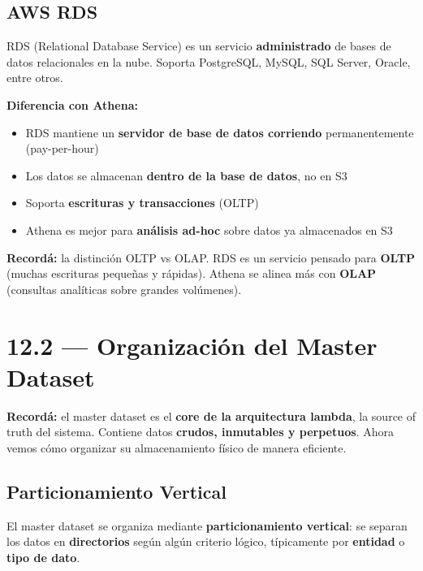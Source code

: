 \documentclass[11pt, a4paper]{article}
\begin{document}
\subsection{AWS RDS}

RDS (Relational Database Service) es un servicio \textbf{administrado} de bases de datos relacionales en la nube. Soporta PostgreSQL, MySQL, SQL Server, Oracle, entre otros.

\textbf{Diferencia con Athena:}
\begin{itemize}
	\item RDS mantiene un \textbf{servidor de base de datos corriendo} permanentemente (pay-per-hour)
	\item Los datos se almacenan \textbf{dentro de la base de datos}, no en S3
	\item Soporta \textbf{escrituras y transacciones} (OLTP)
	\item Athena es mejor para \textbf{análisis ad-hoc} sobre datos ya almacenados en S3
\end{itemize}

\begin{recallbox}
	\textbf{Recordá:} la distinción OLTP vs OLAP. RDS es un servicio pensado para \textbf{OLTP} (muchas escrituras pequeñas y rápidas). Athena se alinea más con \textbf{OLAP} (consultas analíticas sobre grandes volúmenes).
\end{recallbox}

\section{12.2 — Organización del Master Dataset}

\begin{recallbox}
	\textbf{Recordá:} el master dataset es el \textbf{core de la arquitectura lambda}, la source of truth del sistema. Contiene datos \textbf{crudos, inmutables y perpetuos}. Ahora vemos cómo organizar su almacenamiento físico de manera eficiente.
\end{recallbox}

\subsection{Particionamiento Vertical}

El master dataset se organiza mediante \textbf{particionamiento vertical}: se separan los datos en \textbf{directorios} según algún criterio lógico, típicamente por \textbf{entidad} o \textbf{tipo de dato}.
\end{document}
